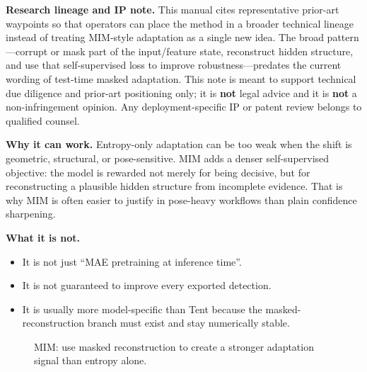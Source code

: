 \textbf{Research lineage and IP note.}
This manual cites representative prior-art waypoints so that operators can place the method in a broader technical lineage instead of treating MIM-style adaptation as a single new idea. The broad pattern---corrupt or mask part of the input/feature state, reconstruct hidden structure, and use that self-supervised loss to improve robustness---predates the current wording of test-time masked adaptation. This note is meant to support technical due diligence and prior-art positioning only; it is \textbf{not} legal advice and it is \textbf{not} a non-infringement opinion. Any deployment-specific IP or patent review belongs to qualified counsel.

\textbf{Why it can work.}
Entropy-only adaptation can be too weak when the shift is geometric, structural, or pose-sensitive.
MIM adds a denser self-supervised objective: the model is rewarded not merely for being decisive, but for reconstructing a plausible hidden structure from incomplete evidence.
That is why MIM is often easier to justify in pose-heavy workflows than plain confidence sharpening.

\textbf{What it is not.}
\begin{itemize}
  \item It is not just ``MAE pretraining at inference time''.
  \item It is not guaranteed to improve every exported detection.
  \item It is usually more model-specific than Tent because the masked-reconstruction branch must exist and stay numerically stable.
\end{itemize}

\begin{figure}[h]
\centering
{}
\caption{MIM: use masked reconstruction to create a stronger adaptation signal than entropy alone.}
\end{figure}

